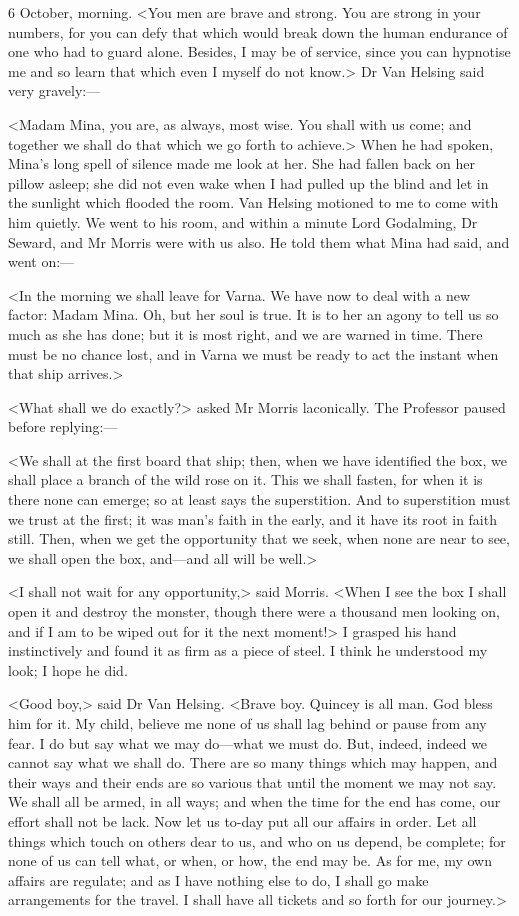 \begin{diary}{6 October, morning.}
<You men are brave and strong. You are strong in your numbers, for you can defy that which would break down the human endurance of one who had to guard alone. Besides, I may be of service, since you can hypnotise me and so learn that which even I myself do not know.> Dr Van Helsing said very gravely:—

<Madam Mina, you are, as always, most wise. You shall with us come; and together we shall do that which we go forth to achieve.> When he had spoken, Mina's long spell of silence made me look at her. She had fallen back on her pillow asleep; she did not even wake when I had pulled up the blind and let in the sunlight which flooded the room. Van Helsing motioned to me to come with him quietly. We went to his room, and within a minute Lord Godalming, Dr Seward, and Mr Morris were with us also. He told them what Mina had said, and went on:—

<In the morning we shall leave for Varna. We have now to deal with a new factor: Madam Mina. Oh, but her soul is true. It is to her an agony to tell us so much as she has done; but it is most right, and we are warned in time. There must be no chance lost, and in Varna we must be ready to act the instant when that ship arrives.>

<What shall we do exactly?> asked Mr Morris laconically. The Professor paused before replying:—

<We shall at the first board that ship; then, when we have identified the box, we shall place a branch of the wild rose on it. This we shall fasten, for when it is there none can emerge; so at least says the superstition. And to superstition must we trust at the first; it was man's faith in the early, and it have its root in faith still. Then, when we get the opportunity that we seek, when none are near to see, we shall open the box, and—and all will be well.>

<I shall not wait for any opportunity,> said Morris. <When I see the box I shall open it and destroy the monster, though there were a thousand men looking on, and if I am to be wiped out for it the next moment!> I grasped his hand instinctively and found it as firm as a piece of steel. I think he understood my look; I hope he did.

<Good boy,> said Dr Van Helsing. <Brave boy. Quincey is all man. God bless him for it. My child, believe me none of us shall lag behind or pause from any fear. I do but say what we may do—what we must do. But, indeed, indeed we cannot say what we shall do. There are so many things which may happen, and their ways and their ends are so various that until the moment we may not say. We shall all be armed, in all ways; and when the time for the end has come, our effort shall not be lack. Now let us to-day put all our affairs in order. Let all things which touch on others dear to us, and who on us depend, be complete; for none of us can tell what, or when, or how, the end may be. As for me, my own affairs are regulate; and as I have nothing else to do, I shall go make arrangements for the travel. I shall have all tickets and so forth for our journey.>


\end{diary}
